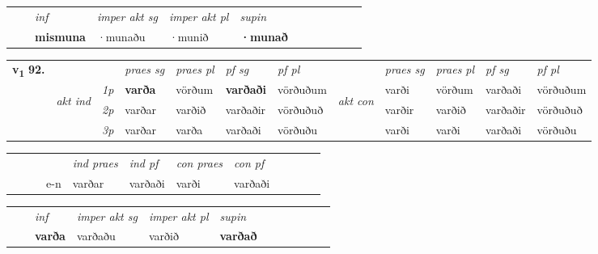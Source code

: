 \begin{tabular}{llllllllllll}
 & & \textit{inf} & \textit{imper akt sg} & \textit{imper akt pl}    & \textit{supin}       \\*
  & & \textbf{mismuna} & ·munaðu  & ·munið    &  \textbf{·munað}   \\*
\cmidrule{1-12}
\end{tabular}



\begin{tabular}{llllllllllll} \toprule
\multirow{4}{*}{{{\textbf{v{\textsubscript{1}}} \Large{\textbf{92.}}}}}  & &   &  \textit{praes sg}  & \textit{praes pl}  &\textit{ pf sg} & \textit{pf pl} &  &  \textit{praes sg}  & \textit{praes pl}  & \textit{pf sg} & \textit{pf pl } \\*
	\cmidrule{4-7} \cmidrule{9-12}
 & \multirow{3}{*}{\begin{turn}{90}\textit{akt ind}\end{turn}} & {\textit{1p}} & \textbf{varða} & vörðum    & \textbf{varðaði} & vörðuðum & \multirow{3}{*}{\begin{turn}{90}\textit{akt con}\end{turn}} &varði & vörðum & varðaði & vörðuðum\\*
& &  {\textit{2p}} &  varðar  & varðið   & varðaðir & vörðuðuð & & varðir & varðið & varðaðir & vörðuðuð \\*
& &  {\textit{3p}} & varðar & varða   & varðaði & vörðuðu & & varði & varði& varðaði & vörðuðu  \\*
\cmidrule{4-7} \cmidrule{9-12}
\end{tabular}


\begin{tabular}{llllllllllll}
 & &  & &  \textit{ind praes} & \textit{ind pf} & \textit{con praes} & \textit{con pf} \\*
&  & & e-n & varðar & varðaði & varði & varðaði \\*
\cmidrule{5-9}
\end{tabular}


\begin{tabular}{llllllllllll}
 & & \textit{inf} & \textit{imper akt sg} & \textit{imper akt pl}    & \textit{supin}       \\*
  & & \textbf{varða} & varðaðu  & varðið    &  \textbf{varðað}   \\*
\cmidrule{1-12}
\end{tabular}



